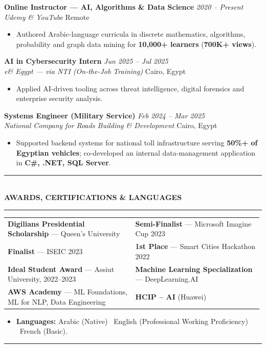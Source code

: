 \documentclass[10pt, a4paper]{article}
\makeatletter
\newcommand{\cvsection}[1]{%
  \vspace{3pt}%
  {\color{navy}\rule{\linewidth}{1.1pt}}\\[0.5pt]%
  {\color{navy}\bfseries\fontsize{9.5}{11}\selectfont\uppercase{#1}}\\[-4pt]%
  {\color{teal}\rule{\linewidth}{0.6pt}}%
  \vspace{2pt}%
}
\newcommand{\cventry}[4]{%
  \vspace{2.5pt}%
  \textbf{\color{darkgray}#1} \hfill {\color{midgray}\textit{#3}}\\[-1.5pt]%
  {\color{teal}\textit{#2}} \hfill {\color{midgray}#4}%
}
\newenvironment{cvitems}{%
  \begin{itemize}[leftmargin=11pt, itemsep=0.5pt, parsep=0pt, topsep=1pt,
                  label={\textcolor{teal}{$\bullet$}}]
}{%
  \end{itemize}%
}
\newenvironment{dualcol}{%
  \begin{tabular*}{\linewidth}{@{}p{0.495\linewidth}@{\hspace{0.01\linewidth}}p{0.495\linewidth}@{}}
}{%
  \end{tabular*}%
}
\makeatother
\begin{document}
\cventry{Online Instructor --- AI, Algorithms \& Data Science}{Udemy \& YouTube}
        {2020 -- Present}{Remote}
\begin{cvitems}
  \item Authored Arabic-language curricula in discrete mathematics, algorithms, probability and graph data mining for \textbf{10,000+ learners} (\textbf{700K+ views}).
\end{cvitems}

\cventry{AI in Cybersecurity Intern}{e\& Egypt --- via NTI (On-the-Job Training)}
        {Jun 2025 -- Jul 2025}{Cairo, Egypt}
\begin{cvitems}
  \item Applied AI-driven tooling across threat intelligence, digital forensics and enterprise security analysis.
\end{cvitems}

\cventry{Systems Engineer (Military Service)}{National Company for Roads Building \& Development}
        {Feb 2024 -- Mar 2025}{Cairo, Egypt}
\begin{cvitems}
  \item Supported backend systems for national toll infrastructure serving \textbf{50\%+ of Egyptian vehicles}; co-developed an internal data-management application in \textbf{C\#, .NET, SQL Server}.
\end{cvitems}

\cvsection{Awards, Certifications \& Languages}

\begin{dualcol}
  \textbf{Digilians Presidential Scholarship} --- Queen's University &
  \textbf{Semi-Finalist} --- Microsoft Imagine Cup 2023 \\[2pt]
  \textbf{Finalist} --- ISEIC 2023 &
  \textbf{1st Place} --- Smart Cities Hackathon 2022 \\[2pt]
  \textbf{Ideal Student Award} --- Assiut University, 2022--2023 &
  \textbf{Machine Learning Specialization} --- DeepLearning.AI \\[2pt]
  \textbf{AWS Academy} --- ML Foundations, ML for NLP, Data Engineering &
  \textbf{HCIP -- AI} (Huawei) \\
\end{dualcol}

\begin{cvitems}
  \item \textbf{Languages:} Arabic (Native) \textperiodcentered\ English (Professional Working Proficiency) \textperiodcentered\ French (Basic).
\end{cvitems}

\vspace{3pt}
{\color{navy}\rule{\linewidth}{0.8pt}}
\end{document}
